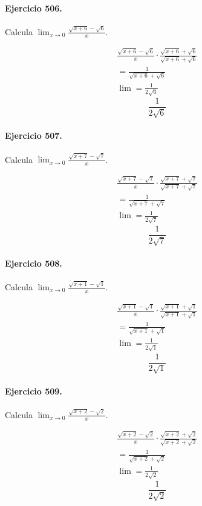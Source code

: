 \documentclass[11pt,a4paper]{article}
\begin{document}
\paragraph{Ejercicio 506.} Calcula $\displaystyle\lim_{x\to0}\frac{\sqrt{x+6}-\sqrt{6}}{x}$.

\[
\begin{aligned}
\frac{\sqrt{x+6}-\sqrt{6}}{x}\cdot \frac{\sqrt{x+6}+\sqrt{6}}{\sqrt{x+6}+\sqrt{6}}\\
=\frac{1}{\sqrt{x+6}+\sqrt{6}}\\
\lim=\frac{1}{2\sqrt{6}}
\end{aligned}
\]
\[\boxed{\frac{1}{2\sqrt{6}}}\]


\paragraph{Ejercicio 507.} Calcula $\displaystyle\lim_{x\to0}\frac{\sqrt{x+7}-\sqrt{7}}{x}$.

\[
\begin{aligned}
\frac{\sqrt{x+7}-\sqrt{7}}{x}\cdot \frac{\sqrt{x+7}+\sqrt{7}}{\sqrt{x+7}+\sqrt{7}}\\
=\frac{1}{\sqrt{x+7}+\sqrt{7}}\\
\lim=\frac{1}{2\sqrt{7}}
\end{aligned}
\]
\[\boxed{\frac{1}{2\sqrt{7}}}\]


\paragraph{Ejercicio 508.} Calcula $\displaystyle\lim_{x\to0}\frac{\sqrt{x+1}-\sqrt{1}}{x}$.

\[
\begin{aligned}
\frac{\sqrt{x+1}-\sqrt{1}}{x}\cdot \frac{\sqrt{x+1}+\sqrt{1}}{\sqrt{x+1}+\sqrt{1}}\\
=\frac{1}{\sqrt{x+1}+\sqrt{1}}\\
\lim=\frac{1}{2\sqrt{1}}
\end{aligned}
\]
\[\boxed{\frac{1}{2\sqrt{1}}}\]


\paragraph{Ejercicio 509.} Calcula $\displaystyle\lim_{x\to0}\frac{\sqrt{x+2}-\sqrt{2}}{x}$.

\[
\begin{aligned}
\frac{\sqrt{x+2}-\sqrt{2}}{x}\cdot \frac{\sqrt{x+2}+\sqrt{2}}{\sqrt{x+2}+\sqrt{2}}\\
=\frac{1}{\sqrt{x+2}+\sqrt{2}}\\
\lim=\frac{1}{2\sqrt{2}}
\end{aligned}
\]
\[\boxed{\frac{1}{2\sqrt{2}}}\]
\end{document}
